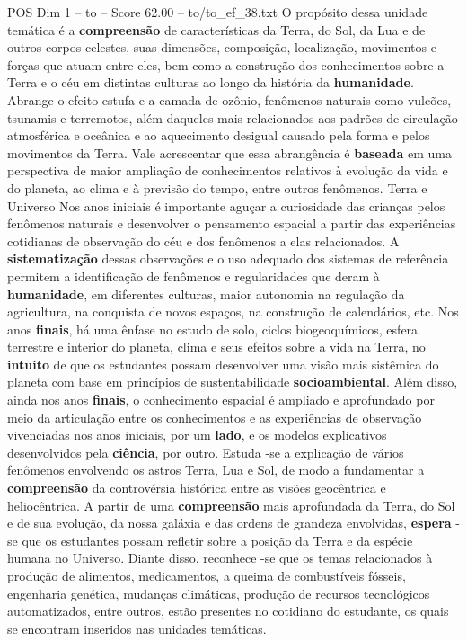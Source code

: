 \begin{textsample}{POS Dim 1 – to – Score 62.00 – to/to\_ef\_38.txt}
O propósito dessa unidade temática é a \textbf{compreensão} de características da Terra, do Sol, da Lua e de outros corpos celestes, suas dimensões, composição, localização, movimentos e forças que atuam entre eles, bem como a construção dos conhecimentos sobre a Terra e o céu em distintas culturas ao longo da história da \textbf{humanidade}.
Abrange o efeito estufa e a camada de ozônio, fenômenos naturais como vulcões, tsunamis e terremotos, além daqueles mais relacionados aos padrões de circulação atmosférica e oceânica e ao aquecimento desigual causado pela forma e pelos movimentos da Terra.
Vale acrescentar que essa abrangência é \textbf{baseada} em uma perspectiva de maior ampliação de conhecimentos relativos à evolução da vida e do planeta, ao clima e à previsão do tempo, entre outros fenômenos.
Terra e Universo Nos anos iniciais é importante aguçar a curiosidade das crianças pelos fenômenos naturais e desenvolver o pensamento espacial a partir das experiências cotidianas de observação do céu e dos fenômenos a elas relacionados.
A \textbf{sistematização} dessas observações e o uso adequado dos sistemas de referência permitem a identificação de fenômenos e regularidades que deram à \textbf{humanidade}, em diferentes culturas, maior autonomia na regulação da agricultura, na conquista de novos espaços, na construção de calendários, etc.
Nos anos \textbf{finais}, há uma ênfase no estudo de solo, ciclos biogeoquímicos, esfera terrestre e interior do planeta, clima e seus efeitos sobre a vida na Terra, no \textbf{intuito} de que os estudantes possam desenvolver uma visão mais sistêmica do planeta com base em princípios de sustentabilidade \textbf{socioambiental}.
Além disso, ainda nos anos \textbf{finais}, o conhecimento espacial é ampliado e aprofundado por meio da articulação entre os conhecimentos e as experiências de observação vivenciadas nos anos iniciais, por um \textbf{lado}, e os modelos explicativos desenvolvidos pela \textbf{ciência}, por outro.
Estuda -se a explicação de vários fenômenos envolvendo os astros Terra, Lua e Sol, de modo a fundamentar a \textbf{compreensão} da controvérsia histórica entre as visões geocêntrica e heliocêntrica.
A partir de uma \textbf{compreensão} mais aprofundada da Terra, do Sol e de sua evolução, da nossa galáxia e das ordens de grandeza envolvidas, \textbf{espera} -se que os estudantes possam refletir sobre a posição da Terra e da espécie humana no Universo.
Diante disso, reconhece -se que os temas relacionados à produção de alimentos, medicamentos, a queima de combustíveis fósseis, engenharia genética, mudanças climáticas, produção de recursos tecnológicos automatizados, entre outros, estão presentes no cotidiano do estudante, os quais se encontram inseridos nas unidades temáticas.

\end{textsample}
